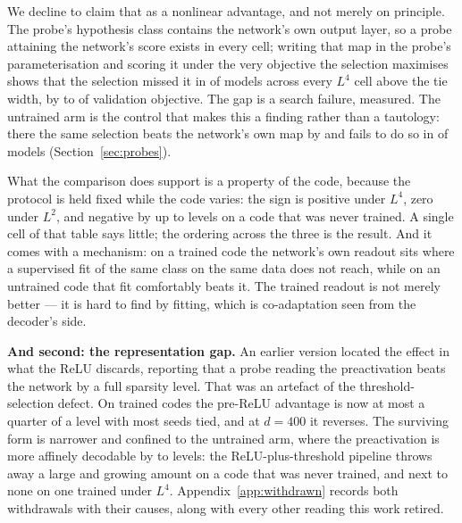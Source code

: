 We decline to claim that as a nonlinear advantage, and not merely on principle. The probe's
hypothesis class contains the network's own output layer, so a probe attaining the network's score
exists in every cell; writing that map in the probe's parameterisation and scoring it under the very
objective the selection maximises shows that the selection missed it in \CeilLfourMissed{} of
\CeilLfourModels{} models across every $L^4$ cell above the tie width, by
\CeilLfourHundredValGap{} to \CeilLfourFourHundredValGap{} of validation objective. The gap is a
search failure, measured. The untrained arm is the control that makes this a finding rather than a
tautology: there the same selection beats the network's own map by \CeilRandFourHundredValGap{} and
fails to do so in \CeilRandMissed{} of \CeilRandModels{} models (Section~\ref{sec:probes}).

What the comparison does support is a property of the code, because the
protocol is held fixed while the code varies: the sign is positive under $L^4$, zero under $L^2$, and
negative by up to \PrimRandFourHundredDiff{} levels on a code that was never trained. A single cell
of that table says little; the ordering across the three is the result. And it comes with a
mechanism: on a trained code the network's own readout sits where a supervised fit of the same class
on the same data does not reach, while on an untrained code that fit comfortably beats it. The
trained readout is not merely better --- it is hard to find by fitting, which is co-adaptation seen
from the decoder's side.

\textbf{And second: the representation gap.} An earlier version located the effect in what the ReLU
discards, reporting that a probe reading the preactivation beats the network by a full sparsity level.
That was an artefact of the threshold-selection defect. On trained codes the pre-ReLU advantage is now
at most a quarter of a level with most seeds tied, and at $d=400$ it reverses. The surviving form is
narrower and confined to the untrained arm, where the preactivation is more affinely decodable by
\PrimRandFiftyPreDiff{} to \PrimRandFourHundredPreDiff{} levels: the ReLU-plus-threshold pipeline
throws away a large and growing amount on a code that was never trained, and next to none on one
trained under $L^4$. Appendix~\ref{app:withdrawn} records both withdrawals with their causes, along
with every other reading this work retired.

